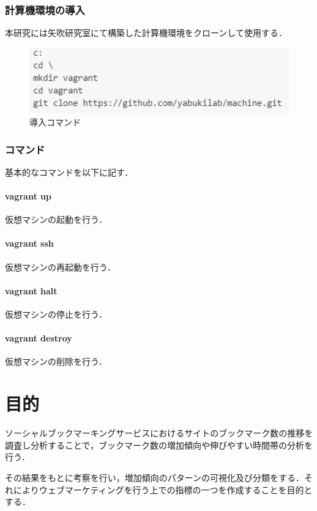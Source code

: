 \subsection{計算機環境の導入}
本研究には矢吹研究室にて構築した計算機環境をクローンして使用する．
\begin{figure}[htb]
\centering
\includegraphics[width=13cm]{cl.PNG}
\caption{導入コマンド}\label{clone}
\end{figure}

\subsection{コマンド}
基本的なコマンドを以下に記す．


\subsubsection{vagrant up}
仮想マシンの起動を行う．
\subsubsection{vagrant ssh}
仮想マシンの再起動を行う．
\subsubsection{vagrant halt}
仮想マシンの停止を行う．
\subsubsection{vagrant destroy}
仮想マシンの削除を行う．


\chapter{目的}

ソーシャルブックマーキングサービスにおけるサイトのブックマーク数の推移を調査し分析することで，ブックマーク数の増加傾向や伸びやすい時間帯の分析を行う．\par
その結果をもとに考察を行い，増加傾向のパターンの可視化及び分類をする．それによりウェブマーケティングを行う上での指標の一つを作成することを目的とする．

